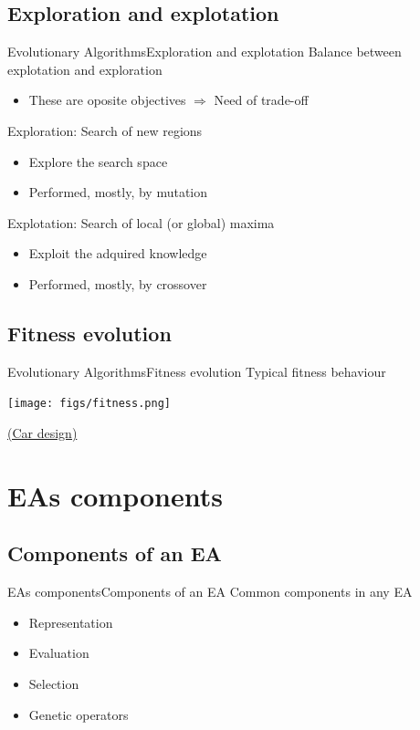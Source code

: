 \documentclass[10pt,compress]{beamer} %
\begin{document}
\subsection{Exploration and explotation}
\begin{frame}{Evolutionary Algorithms}{Exploration and explotation} 
	Balance between \alert{explotation} and \alert{exploration}
        \begin{itemize}
	    \item These are oposite objectives $\Rightarrow$ Need of trade-off
        \end{itemize}
	Exploration: Search of new regions%
		\begin{itemize}
		\item Explore the search space
		\item Performed, mostly, by mutation
		\end{itemize}
	Explotation: Search of local (or global) maxima%
		\begin{itemize}
		\item Exploit the adquired knowledge
		\item Performed, mostly, by crossover
		\end{itemize}
\end{frame}

\subsection{Fitness evolution}

\begin{frame}{Evolutionary Algorithms}{Fitness evolution} 
	Typical fitness behaviour
    \vspace{-0.3cm}
	\begin{center}
	\texttt{[image: figs/fitness.png]}\\
	\end{center}

    \vspace{-0.3cm}
	\href{http://rednuht.org/genetic\_cars\_2/} {(Car design)}
\end{frame}


\section{EAs components}
\subsection{Components of an EA}
\begin{frame}{EAs components}{Components of an EA}
	Common components in any EA
	\begin{itemize}
		\item Representation
		\item Evaluation
		\item Selection
		\item Genetic operators
	\end{itemize}
\end{frame}
\end{document}
